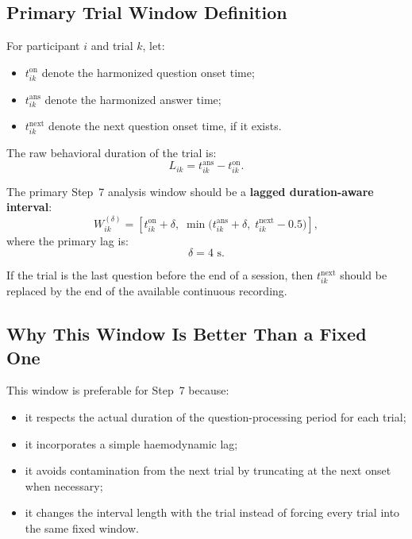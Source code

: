 \subsection{Primary Trial Window Definition}
For participant \(i\) and trial \(k\), let:
\begin{itemize}
    \item \(t^{\mathrm{on}}_{ik}\) denote the harmonized question onset time;
    \item \(t^{\mathrm{ans}}_{ik}\) denote the harmonized answer time;
    \item \(t^{\mathrm{next}}_{ik}\) denote the next question onset time, if it exists.
\end{itemize}

The raw behavioral duration of the trial is:
\begin{equation}
L_{ik} = t^{\mathrm{ans}}_{ik} - t^{\mathrm{on}}_{ik}.
\end{equation}

The primary Step~7 analysis window should be a \textbf{lagged duration-aware interval}:
\begin{equation}
W^{(\delta)}_{ik}
=
\left[
t^{\mathrm{on}}_{ik} + \delta,\;
\min\!\bigl(t^{\mathrm{ans}}_{ik} + \delta,\; t^{\mathrm{next}}_{ik} - 0.5\bigr)
\right],
\end{equation}
where the primary lag is:
\begin{equation}
\delta = 4 \text{ s}.
\end{equation}

If the trial is the last question before the end of a session, then \(t^{\mathrm{next}}_{ik}\) should be
replaced by the end of the available continuous recording.

\subsection{Why This Window Is Better Than a Fixed One}
This window is preferable for Step~7 because:
\begin{itemize}
    \item it respects the actual duration of the question-processing period for each trial;
    \item it incorporates a simple haemodynamic lag;
    \item it avoids contamination from the next trial by truncating at the next onset when necessary;
    \item it changes the interval length with the trial instead of forcing every trial into the same fixed window.
\end{itemize}

